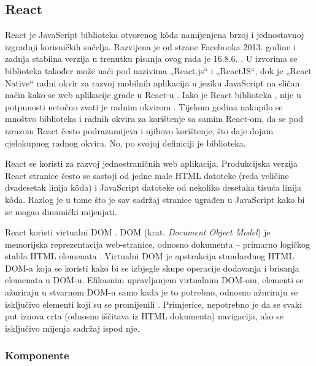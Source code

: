 \documentclass[times, utf8, diplomski, numeric]{fer}
\newcommand{\razmakp}{\vspace{18pt}}
\newcommand{\razmaks}{\vspace{10pt}}
\begin{document}
\razmaks
\subsection{React} \label{sec:react}

React je JavaScript biblioteka otvorenog kôda namijenjena brzoj i jednostavnoj izgradnji korisničkih sučelja.
Razvijena je od strane Facebooka 2013. godine i zadnja stabilna verzija u trenutku pisanja ovog rada je 16.8.6. \citep{gh_react_changelog}.
U izvorima se biblioteka također može naći pod nazivima „React.js“ i „ReactJS“, dok je „React Native“ radni okvir za razvoj mobilnih aplikacija u jeziku JavaScript na sličan način kako se web aplikacije grade u React-u \citep{wiki_react}.
Iako je React biblioteka , nije u potpunosti netočno zvati je radnim okvirom .
Tijekom godina nakupilo se mnoštvo biblioteka i radnih okvira za korištenje sa samim React-om, da se pod izrazom React često podrazumijeva i njihovo korištenje, što daje dojam cjelokupnog radnog okvira. No, po svojoj definiciji je biblioteka.

React se koristi za razvoj jednostraničnih  web aplikacija.
Produkcijska verzija React stranice često se sastoji od jedne male HTML datoteke (reda veličine dvadesetak linija kôda) i JavaScript datoteke od nekoliko desetaka tisuća linija kôda.
Razlog je u tome što je sav sadržaj stranice ugrađen u JavaScript kako bi se mogao dinamički mijenjati.

\razmakp

React koristi virtualni DOM .
DOM (krat. \emph{Document Object Model}) je memorijska reprezentacija web-stranice, odnosno dokumenta – primarno logičkog stabla HTML elemenata \citep{mdn_dom}.
Virtualni DOM je apstrakcija standardnog HTML DOM-a koja se koristi kako bi se izbjegle skupe operacije dodavanja i brisanja elemenata u DOM-u.
Efikasnim upravljanjem virtualnim DOM-om, elementi se ažuriraju u stvarnom DOM-u samo kada je to potrebno, odnosno ažuriraju se isključivo elementi koji su se promijenili \citep{med_vdom}.
Primjerice, nepotrebno je da se svaki put iznova crta (odnosno iščitava iz HTML dokumenta) navigacija, ako se isključivo mijenja sadržaj ispod nje.

\razmakp
\subsubsection{Komponente}
\end{document}
